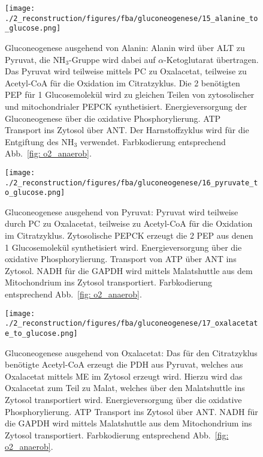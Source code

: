\begin{figure}[!htp]
 \centering
 \texttt{[image: ./2\_reconstruction/figures/fba/gluconeogenese/15\_alanine\_to\_glucose.png]}%
 \caption{Gluconeogenese ausgehend von Alanin: Alanin wird über ALT zu Pyruvat, die $\text{NH}_3$-Gruppe wird dabei auf $\alpha$-Ketoglutarat übertragen. Das Pyruvat wird teilweise mittels PC zu Oxalacetat, teilweise zu Acetyl-CoA für die Oxidation im Citratzyklus. Die 2 benötigten PEP für  1 Glucosemolekül wird zu gleichen Teilen von zytosolischer und mitochondrialer PEPCK synthetisiert. Energieversorgung der Gluconeogenese über die oxidative Phosphorylierung. ATP Transport ins Zytosol über ANT. Der Harnstoffzyklus wird für die Entgiftung des $\text{NH}_3$ verwendet. Farbkodierung entsprechend Abb.~\ref{fig: o2_anaerob}.}
 \label{fig: 15_alanine_to_glucose}
\end{figure}

\begin{figure}[!htp]
 \centering
 \texttt{[image: ./2\_reconstruction/figures/fba/gluconeogenese/16\_pyruvate\_to\_glucose.png]}%
 \caption{Gluconeogenese ausgehend von Pyruvat: Pyruvat wird teilweise durch PC zu Oxalacetat, teilweise zu Acetyl-CoA für die Oxidation im Citratzyklus. Zytosolische PEPCK erzeugt die 2 PEP aus denen 1 Glucosemolekül synthetisiert wird. Energieversorgung über die oxidative Phosphorylierung. Transport von ATP über ANT ins Zytosol. NADH für die GAPDH wird mittels Malatshuttle aus dem Mitochondrium ins Zytosol transportiert. Farbkodierung entsprechend Abb.~\ref{fig: o2_anaerob}.}
 \label{fig: 16_pyruvate_to_glucose}
\end{figure}

\begin{figure}[!htp]
 \centering
 \texttt{[image: ./2\_reconstruction/figures/fba/gluconeogenese/17\_oxalacetate\_to\_glucose.png]}%
 \caption{Gluconeogenese ausgehend von Oxalacetat: Das für den Citratzyklus benötigte Acetyl-CoA erzeugt die PDH aus Pyruvat, welches aus Oxalacetat mittels ME im Zytosol erzeugt wird. Hierzu wird das Oxalacetat zum Teil zu Malat, welches über den Malatshuttle ins Zytosol transportiert wird. Energieversorgung über die oxidative Phosphorylierung. ATP Transport ins Zytosol über ANT. NADH für die GAPDH wird mittels Malatshuttle aus dem Mitochondrium ins Zytosol transportiert. Farbkodierung entsprechend Abb.~\ref{fig: o2_anaerob}.}
 \label{fig: 17_oxalacetate_to_glucose}
\end{figure}

